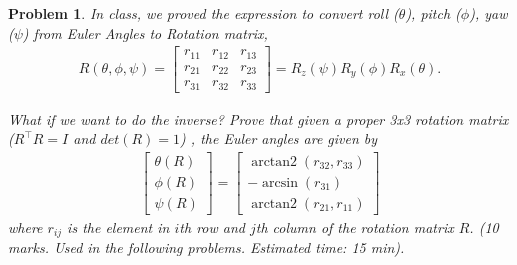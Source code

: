 \documentclass[twocolumn]{article}
\newtheorem{prob}{Problem}
\newif\ifsol
\DeclareMathOperator{\atantwo}{arctan2}
\begin{document}
\begin{prob}
  In class, we proved the expression to convert roll ($\theta$), pitch
  ($\phi$), yaw ($\psi$) from Euler Angles to Rotation matrix,
  \begin{align}
    R(\theta, \phi, \psi) =
    \begin{bmatrix}
      r_{11}& r_{12} & r_{13} \\
      r_{21}& r_{22} & r_{23} \\
      r_{31}& r_{32} & r_{33}
    \end{bmatrix} 
                       = R_z(\psi) R_y(\phi) R_x(\theta).
  \end{align}
  
  What if we want to do the inverse? Prove that given a proper 3x3 rotation
  matrix  ($R^\top R = I$ and $det(R) = 1$) , the Euler angles are given by
  \begin{align}
    \begin{bmatrix}
    \theta(R) \\
    \phi(R) \\
    \psi(R)
    \end{bmatrix}
    = \begin{bmatrix}
      \atantwo(r_{32}, r_{33}) \\
      -\arcsin(r_{31}) \\
      \atantwo(r_{21}, r_{11})
      \end{bmatrix}
  \end{align}
  where $r_{ij}$ is the element in $i$th row and $j$th column of the rotation
  matrix $R$. (10 marks. Used in the
  following problems. Estimated time: 15 min).
\end{prob}

\ifsol
\end{document}
